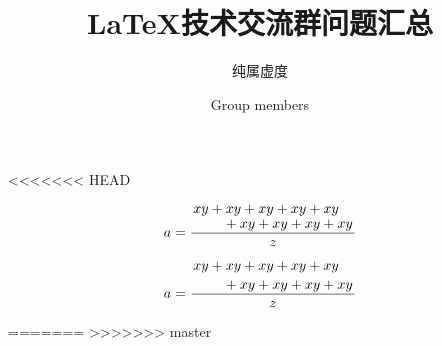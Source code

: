 \documentclass[violet]{tjbook}
\title{\LaTeX{}技术交流群问题汇总}
\subtitle{纯属虚度}
\author{Group members}%
\begin{document}
\maketitle
\makeflypage
\frontmatter
\tableofcontents

\mainmatter










<<<<<<< HEAD
\begin{codeshow}
\[
a=\frac{
\splitfrac{xy + xy + xy + xy + xy}
	       {+ xy + xy + xy + xy}
       }
       {z}
\]
\end{codeshow}
\begin{codeshow}
\[
a=\frac{
\splitdfrac{xy + xy + xy + xy + xy}
            {+ xy + xy + xy + xy}
	}
    {z}
\]
\end{codeshow}

=======
>>>>>>> master

\cleardoublepage
\setlength{\columnsep}{0.75cm}
\printindex

\makebackcover
\end{document}
